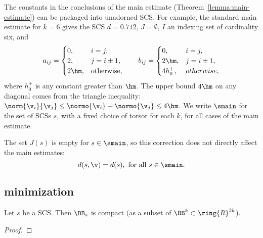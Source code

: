 \begin{definition}[$\smain$]\label{ex:main} 
The constants in the conclusions of the main estimate
  (Theorem~\ref{lemma:main-estimate}) can be packaged into unadorned SCS.  
For example, the standard main estimate for $k=6$ gives
  the SCS $d=0.712$, $J=\emptyset$, $I$ an indexing set
  of cardinality six, and
\[
a_{ij} = \begin{cases} 0, & i=j,\\
  2, & j= i\pm1,\\
  2 \hm, & \text{otherwise},
  \end{cases}
\qquad
b_{ij}=\begin{cases}
 0, & i=j,\\
 2\hm, & j= i\pm1,\\
 4h_0^+, & otherwise,
  \end{cases}
\]
where $h_0^+$ is any constant greater than $\hm$.
The upper bound $4\hm$ on any diagonal comes from the triangle
inequality: $\norm{\v_i}{\v_j} \le \normo{\v_i}+\normo{\v_j} \le
4\hm$.   
We write $\smain$ for the set of SCSs $s$, with a
fixed choice of torsor for each $k$, for all cases of the main
estimate.
\end{definition}
%

The set $J(s)$ is empty for $s\in \smain$, so this correction does not
directly affect the main estimates:
\[
d(s,\v) = d(s), \text{ for all } s \in \smain.
\]





\subsection{minimization}


\begin{lemma} \label{lemma:aug-compact}
Let $s$ be a SCS. Then
$\BB_s$ is compact (as a subset of
$\BB^k \subset \ring{R}^{3k}$).
\end{lemma}

\begin{proof}  
\end{proof}

